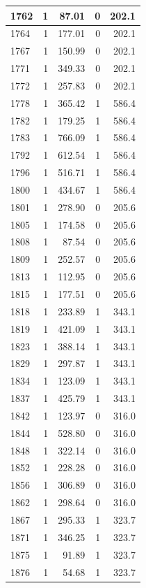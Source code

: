 \documentclass[
  spanish,
  12pt,
]{book}
\begin{document}
\begin{tabular}{l|r|r|r|r}
\hline
1762 & 1 & 87.01 & 0 & 202.1\\
\hline
1764 & 1 & 177.01 & 0 & 202.1\\
\hline
1767 & 1 & 150.99 & 0 & 202.1\\
\hline
1771 & 1 & 349.33 & 0 & 202.1\\
\hline
1772 & 1 & 257.83 & 0 & 202.1\\
\hline
1778 & 1 & 365.42 & 1 & 586.4\\
\hline
1782 & 1 & 179.25 & 1 & 586.4\\
\hline
1783 & 1 & 766.09 & 1 & 586.4\\
\hline
1792 & 1 & 612.54 & 1 & 586.4\\
\hline
1796 & 1 & 516.71 & 1 & 586.4\\
\hline
1800 & 1 & 434.67 & 1 & 586.4\\
\hline
1801 & 1 & 278.90 & 0 & 205.6\\
\hline
1805 & 1 & 174.58 & 0 & 205.6\\
\hline
1808 & 1 & 87.54 & 0 & 205.6\\
\hline
1809 & 1 & 252.57 & 0 & 205.6\\
\hline
1813 & 1 & 112.95 & 0 & 205.6\\
\hline
1815 & 1 & 177.51 & 0 & 205.6\\
\hline
1818 & 1 & 233.89 & 1 & 343.1\\
\hline
1819 & 1 & 421.09 & 1 & 343.1\\
\hline
1823 & 1 & 388.14 & 1 & 343.1\\
\hline
1829 & 1 & 297.87 & 1 & 343.1\\
\hline
1834 & 1 & 123.09 & 1 & 343.1\\
\hline
1837 & 1 & 425.79 & 1 & 343.1\\
\hline
1842 & 1 & 123.97 & 0 & 316.0\\
\hline
1844 & 1 & 528.80 & 0 & 316.0\\
\hline
1848 & 1 & 322.14 & 0 & 316.0\\
\hline
1852 & 1 & 228.28 & 0 & 316.0\\
\hline
1856 & 1 & 306.89 & 0 & 316.0\\
\hline
1862 & 1 & 298.64 & 0 & 316.0\\
\hline
1867 & 1 & 295.33 & 1 & 323.7\\
\hline
1871 & 1 & 346.25 & 1 & 323.7\\
\hline
1875 & 1 & 91.89 & 1 & 323.7\\
\hline
1876 & 1 & 54.68 & 1 & 323.7\\

\end{tabular}
\end{document}
